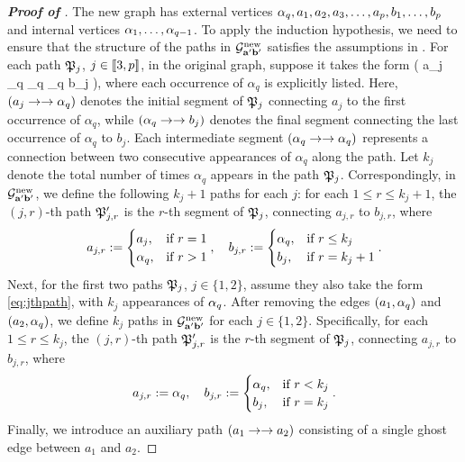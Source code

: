 \begin{proof}[\bf Proof of ]
The new graph has external vertices \(\alpha_q, a_1,a_2, a_3, \ldots, a_p,  b_1, \ldots,  b_p\) and internal vertices $\alpha_1,  \ldots,  \alpha_{q-1}$. To apply the induction hypothesis, we need to ensure that the structure of the paths in $\mathcal G^{\mathrm{new}}_{{\mathbf{a}}' {\mathbf{b}}'}$ satisfies the assumptions in .  
For each path $\mathfrak{P}_j$, $j\in \llbracket{3,p}\rrbracket$, in the original graph, suppose it takes the form 
\be\label{eq:jthpath}( a_j \too  \al_q \too \al_q \too \cdots \too  \al_q \too b_j ),\ee 
where each occurrence of $\alpha_q$ is explicitly listed. Here, $(a_j \to \to \alpha_q)$ denotes the initial segment of $\mathfrak{P}_j$ connecting $a_j$ to the first occurrence of $\alpha_q$, while $(\alpha_q \to \to b_j)$ denotes the final segment connecting the last occurrence of $\alpha_q$ to $b_j$. Each intermediate segment $(\alpha_q \to \to \alpha_q)$ represents a connection between two consecutive appearances of $\alpha_q$ along the path. Let $k_j$ denote the total number of times $\alpha_q$ appears in the path $\mathfrak{P}_j$. 
Correspondingly, in $\mathcal G^{\mathrm{new}}_{{\mathbf{a}}'{\mathbf{b}}'}$, we define the following $k_j+1$ paths for each $j$: for each $1 \leq r \leq k_j + 1$, the $(j,r)$-th path $\mathfrak{P}'_{j,r}$ is the $r$-th segment of $\mathfrak{P}_j$, connecting $a_{j,r}$ to $b_{j,r}$, where  
\begin{equation}
a_{j,r}:=  \begin{cases} a_j, & \text{if} \ r=1\\
\al_q, & \text{if} \ r>1
    \end{cases},\quad  b_{j,r}:=  \begin{cases} \al_q,  &\text{if} \ r\le k_j\\
    b_j, &\text{if} \ r= k_j +1
    \end{cases}. %
\end{equation}
Next, for the first two paths $\mathfrak{P}_j$, $j \in \{1, 2\}$, assume they also take the form \eqref{eq:jthpath}, with $k_j$ appearances of $\alpha_q$. After removing the edges $(a_1,\alpha_q)$ and $(a_2,\alpha_q)$, we define $k_j$ paths in $\mathcal G^{\mathrm{new}}_{{\mathbf{a}}'{\mathbf{b}}'}$ for each $j\in\{1,2\}$. Specifically, for each $1 \leq r \leq k_j$, the $(j,r)$-th path $\mathfrak{P}'_{j,r}$ is the $r$-th segment of $\mathfrak{P}_j$, connecting $a_{j,r}$ to $b_{j,r}$, where  
\begin{equation}
a_{j,r}:= \al_q,\quad  b_{j,r}:=  \begin{cases} \al_q,  &\text{if} \ r< k_j\\
    b_j, &\text{if} \ r= k_j
    \end{cases}. %
\end{equation}
Finally, we introduce an auxiliary path $(a_1\to \to a_2)$ consisting of a single ghost edge between $a_1$ and $a_2$. 


\end{proof}
